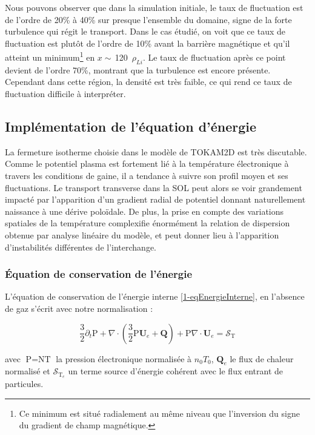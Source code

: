 \begin{refsection}
Nous pouvons observer que dans la simulation initiale, le taux de fluctuation
est de l'ordre de 20\% à 40\% sur presque l'ensemble du domaine, signe de la forte
turbulence qui régit le transport.
Dans le cas étudié, on voit que ce taux de fluctuation est plutôt de
l'ordre de 10\% avant la barrière magnétique et qu'il atteint un
minimum\footnote{Ce minimum est situé radialement au même niveau que
l'inversion du signe du gradient de champ magnétique.} en
$x\sim\,$120~$\rho_{Li}$. Le taux de fluctuation après ce point devient de
l'ordre 70\%, montrant que la turbulence est encore présente. Cependant dans
 cette région, la densité est très faible, ce qui rend ce taux de
 fluctuation difficile à interpréter.

	\subsection{Implémentation de l'équation d'énergie}
	La fermeture isotherme choisie dans le modèle de TOKAM2D est très
	discutable. Comme le potentiel plasma est fortement lié à la température
	électronique à travers les conditions de gaine, il a tendance à suivre son
	profil moyen et ses fluctuations. Le transport transverse dans la SOL peut
	alors se voir grandement impacté par l'apparition d'un gradient radial de
	potentiel donnant naturellement naissance à une dérive poloïdale. De plus,
	la prise en compte des variations spatiales de la température complexifie énormément la relation de
	dispersion obtenue par analyse linéaire du modèle, et peut donner lieu à
	l'apparition d'instabilités différentes de l'interchange\parencite{Tamain}.
	
	\subsubsection{Équation de conservation de l'énergie}
	
	L'équation de conservation de l'énergie interne
	\ref{1-eqEnergieInterne}, en l'absence de gaz s'écrit avec notre normalisation
	:
	
	\begin{equation} 
	\label{2-eqTempBase}
		\frac{3}{2}\partial_t \text{P} +
		\nabla\cdot\left(\frac{3}{2}\text{P}\mathbf{U}_e+\mathbf{Q}\right) +
		\text{P}\nabla\cdot\mathbf{U}_e=\mathcal{S}_{\text{T}} 
	\end{equation}
	
	avec $\text{P}=\text{NT}$ la pression électronique normalisée à $n_0T_0$,
	$\mathbf{Q}_e$ le flux de chaleur normalisé et $\mathcal{S}_{\text{T}_e}$ un
	terme source d'énergie cohérent avec le flux entrant de particules. 
	

\end{refsection}

